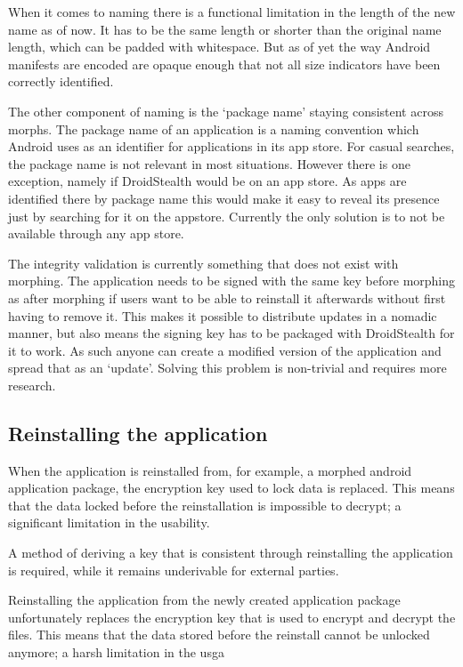 When it comes to naming there is a functional limitation in the length of the new name as of now.
It has to be the same length or shorter than the original name length, which can be padded with whitespace. 
But as of yet the way Android manifests are encoded are opaque enough that not all size indicators have been correctly identified.

The other component of naming is the `package name' staying consistent across morphs. 
The package name of an application is a naming convention which Android uses as an identifier for applications in its app store.
For casual searches, the package name is not relevant in most situations.
However there is one exception, namely if DroidStealth would be on an app store. 
As apps are identified there by package name this would make it easy to reveal its presence just by searching for it on the appstore.
Currently the only solution is to not be available through any app store.

The integrity validation is currently something that does not exist with morphing. 
The application needs to be signed with the same key before morphing as after morphing if users want to be able to reinstall it afterwards without first having to remove it. 
This makes it possible to distribute updates in a nomadic manner, but also means the signing key has to be packaged with DroidStealth for it to work. 
As such anyone can create a modified version of the application and spread that as an `update'.
Solving this problem is non-trivial and requires more research.

\subsection{Reinstalling the application}
When the application is reinstalled from, for example, a morphed android application package, the encryption key used to lock data is replaced.
This means that the data locked before the reinstallation is impossible to decrypt; a significant limitation in the usability.

A method of deriving a key that is consistent through reinstalling the application is required, while it remains underivable for external parties.

Reinstalling the application from the newly created application package unfortunately replaces the encryption key that is used to encrypt and decrypt the files.
This means that the data stored before the reinstall cannot be unlocked anymore; a harsh limitation in the usga
